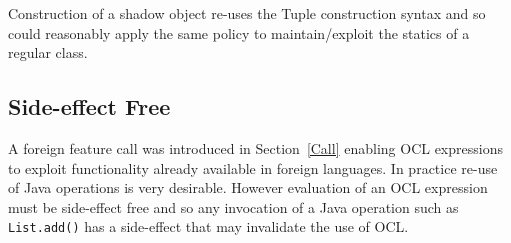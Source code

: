 \documentclass[sigconf]{acmart}
\begin{document}
 
 
 
  


Construction of a shadow object re-uses the Tuple construction syntax and so could reasonably apply the same policy to maintain/exploit the statics of a regular class.






\subsection{Side-effect Free}\label{Side-effect Free}

A foreign feature call was introduced in Section~\ref{Call} enabling OCL expressions to exploit functionality already available in foreign languages. In practice re-use of Java operations is very desirable. However evaluation of an OCL expression must be side-effect free and so any invocation of a Java operation such as \verb|List.add()| has a side-effect that may invalidate the use of OCL.
\end{document}
